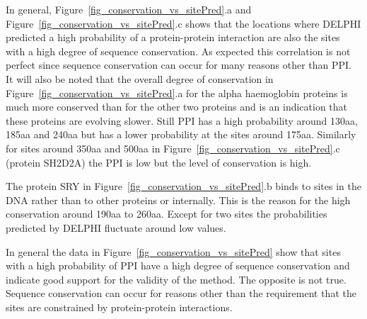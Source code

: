 \textcolor{\mySecondColor}{In general, Figure~\ref{fig_conservation_vs_sitePred}.a and Figure~\ref{fig_conservation_vs_sitePred}.c shows that the locations where
DELPHI predicted a high probability of a protein-protein interaction are
also the sites with a high degree of sequence conservation.  As expected
this correlation is not perfect since sequence conservation can occur
for many reasons other than PPI.  It will also be noted that the overall
degree of conservation in Figure~\ref{fig_conservation_vs_sitePred}.a for the alpha haemoglobin proteins is
much more conserved than for the other two proteins and is an indication
that these proteins are evolving slower.  Still PPI has a high probability
around 130aa, 185aa and 240aa but has a lower probability at the sites
around 175aa.  Similarly for sites around 350aa and 500aa in Figure~\ref{fig_conservation_vs_sitePred}.c
(protein SH2D2A) the PPI is low but the level of conservation is high.}

\textcolor{\mySecondColor}{The protein SRY in Figure~\ref{fig_conservation_vs_sitePred}.b binds to sites in the DNA rather
than to other proteins or internally.  This is the reason for the
high conservation around 190aa to 260aa.  Except for two sites the
probabilities predicted by DELPHI fluctuate around low values.}

\textcolor{\mySecondColor}{In general the data in Figure~\ref{fig_conservation_vs_sitePred} show that sites with a high probability
of PPI have a high degree of sequence conservation and indicate good
support for the validity of the method.  The opposite is not true.
Sequence conservation can occur for reasons other than the requirement
that the sites are constrained by protein-protein interactions.}

